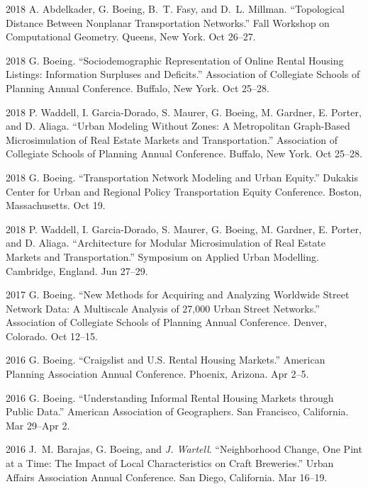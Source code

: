 \documentclass[12pt,letterpaper]{report}
\begin{document}
\begin{tablist}
        \item[2018] \tab{}A. Abdelkader, G. Boeing, B.~T. Fasy, and D.~L. Millman. \enquote{Topological Distance Between Nonplanar Transportation Networks.} Fall Workshop on Computational Geometry. Queens, New York. Oct 26--27.

        \item[2018] \tab{}G. Boeing. \enquote{Sociodemographic Representation of Online Rental Housing Listings: Information Surpluses and Deficits.} Association of Collegiate Schools of Planning Annual Conference. Buffalo, New York. Oct 25--28.

        \item[2018] \tab{}P. Waddell, I. Garcia-Dorado, S. Maurer, G. Boeing, M. Gardner, E. Porter, and D. Aliaga. \enquote{Urban Modeling Without Zones: A Metropolitan Graph-Based Microsimulation of Real Estate Markets and Transportation.} Association of Collegiate Schools of Planning Annual Conference. Buffalo, New York. Oct 25--28.

        \item[2018] \tab{}G. Boeing. \enquote{Transportation Network Modeling and Urban Equity.} Dukakis Center for Urban and Regional Policy Transportation Equity Conference. Boston, Massachusetts. Oct 19.

        \item[2018] \tab{}P. Waddell, I. Garcia-Dorado, S. Maurer, G. Boeing, M. Gardner, E. Porter, and D. Aliaga. \enquote{Architecture for Modular Microsimulation of Real Estate Markets and Transportation.} Symposium on Applied Urban Modelling. Cambridge, England. Jun 27--29.

        \item[2017] \tab{}G. Boeing. \enquote{New Methods for Acquiring and Analyzing Worldwide Street Network Data: A Multiscale Analysis of 27,000 Urban Street Networks.} Association of Collegiate Schools of Planning Annual Conference. Denver, Colorado. Oct 12--15.

        \item[2016] \tab{}G. Boeing. \enquote{Craigslist and U.S. Rental Housing Markets.} American Planning Association Annual Conference. Phoenix, Arizona. Apr 2--5.

        \item[2016] \tab{}G. Boeing. \enquote{Understanding Informal Rental Housing Markets through Public Data.} American Association of Geographers. San Francisco, California. Mar 29--Apr 2.

        \item[2016] \tab{}J.~M. Barajas, G. Boeing, and \textit{J. Wartell}. \enquote{Neighborhood Change, One Pint at a Time: The Impact of Local Characteristics on Craft Breweries.} Urban Affairs Association Annual Conference. San Diego, California. Mar 16--19.


\end{tablist}
\end{document}
